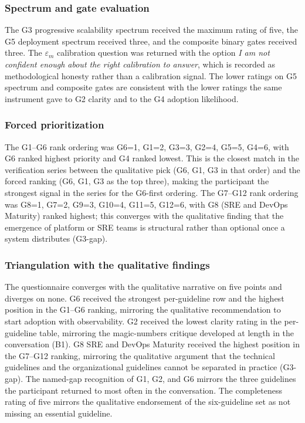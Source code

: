 \subsubsection*{Spectrum and gate evaluation}

The G3 progressive scalability spectrum received the maximum rating of five, the G5 deployment spectrum received three, and the composite binary gates received three. The $\varepsilon_m$ calibration question was returned with the option \emph{I am not confident enough about the right calibration to answer}, which is recorded as methodological honesty rather than a calibration signal. The lower ratings on G5 spectrum and composite gates are consistent with the lower ratings the same instrument gave to G2 clarity and to the G4 adoption likelihood.

\subsubsection*{Forced prioritization}

The G1--G6 rank ordering was G6=1, G1=2, G3=3, G2=4, G5=5, G4=6, with G6 ranked highest priority and G4 ranked lowest. This is the closest match in the verification series between the qualitative pick (G6, G1, G3 in that order) and the forced ranking (G6, G1, G3 as the top three), making the participant the strongest signal in the series for the G6-first ordering. The G7--G12 rank ordering was G8=1, G7=2, G9=3, G10=4, G11=5, G12=6, with G8 (SRE and DevOps Maturity) ranked highest; this converges with the qualitative finding that the emergence of platform or SRE teams is structural rather than optional once a system distributes (G3-gap).

\subsubsection*{Triangulation with the qualitative findings}

The questionnaire converges with the qualitative narrative on five points and diverges on none. G6 received the strongest per-guideline row and the highest position in the G1--G6 ranking, mirroring the qualitative recommendation to start adoption with observability. G2 received the lowest clarity rating in the per-guideline table, mirroring the magic-numbers critique developed at length in the conversation (B1). G8 SRE and DevOps Maturity received the highest position in the G7--G12 ranking, mirroring the qualitative argument that the technical guidelines and the organizational guidelines cannot be separated in practice (G3-gap). The named-gap recognition of G1, G2, and G6 mirrors the three guidelines the participant returned to most often in the conversation. The completeness rating of five mirrors the qualitative endorsement of the six-guideline set as not missing an essential guideline.

